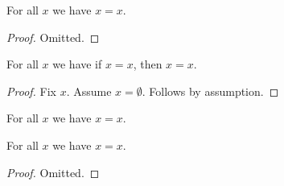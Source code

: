 

\begin{proposition}\label{phase6_admitted_omission}
    For all $x$ we have $x = x$.
\end{proposition}
\begin{proof}
    Omitted.
\end{proof}

\begin{proposition}\label{phase6_rejected_declaration}
    For all $x$ we have if $x = x$, then $x = x$.
\end{proposition}
\begin{proof}
    Fix $x$.
    Assume $x = \emptyset$.
    Follows by assumption.
\end{proof}

\begin{axiom}\label{phase6_unadmitted_axiom}
    For all $x$ we have $x = x$.
\end{axiom}

\begin{proposition}\label{phase6_unadmitted_omission}
    For all $x$ we have $x = x$.
\end{proposition}
\begin{proof}
    Omitted.
\end{proof}
